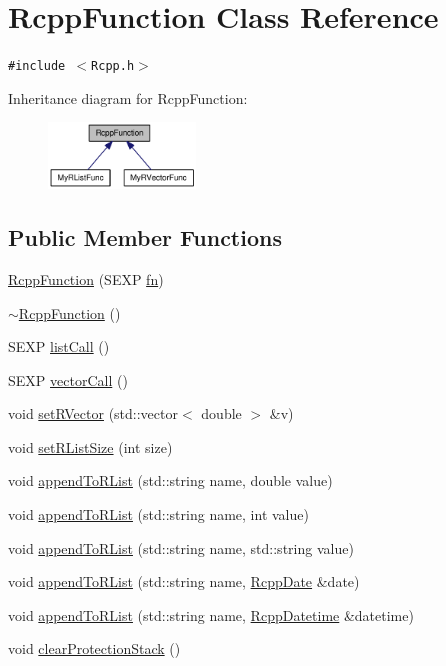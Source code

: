 \hypertarget{classRcppFunction}{
\section{RcppFunction Class Reference}
\label{classRcppFunction}
}
{\tt \#include $<$Rcpp.h$>$}

Inheritance diagram for RcppFunction:\nopagebreak
\begin{figure}[H]
\begin{center}
\leavevmode
\includegraphics[width=111pt]{classRcppFunction__inherit__graph}
\end{center}
\end{figure}
\subsection*{Public Member Functions}
\begin{CompactItemize}
\item 
\hyperlink{classRcppFunction_6fc6fca8d052170d86240c784f54261a}{RcppFunction} (SEXP \hyperlink{classRcppFunction_a6b5966224b8b7d158be6cdfc3612063}{fn})
\item 
\hyperlink{classRcppFunction_e155cf5dd33cb110e9a89a59c7bff6e9}{$\sim$RcppFunction} ()
\item 
SEXP \hyperlink{classRcppFunction_0cc9d29ab7db552494dddefaa78e6578}{listCall} ()
\item 
SEXP \hyperlink{classRcppFunction_c57c514c761609892ff553434e134446}{vectorCall} ()
\item 
void \hyperlink{classRcppFunction_482df5aa5e2a98d52c9a79cf3ab31c67}{setRVector} (std::vector$<$ double $>$ \&v)
\item 
void \hyperlink{classRcppFunction_f3dbcf8dcfbdfc49ef566b5efd0ad978}{setRListSize} (int size)
\item 
void \hyperlink{classRcppFunction_0df1a8ff093e21a2a7c6fc80d6645c7e}{appendToRList} (std::string name, double value)
\item 
void \hyperlink{classRcppFunction_fce449ac5d89b32e0e0b9f584278a672}{appendToRList} (std::string name, int value)
\item 
void \hyperlink{classRcppFunction_861ba7ae5c09acf31a034472b5a47728}{appendToRList} (std::string name, std::string value)
\item 
void \hyperlink{classRcppFunction_9aab0b3accb81d90fb813acf3bf4c49d}{appendToRList} (std::string name, \hyperlink{classRcppDate}{RcppDate} \&date)
\item 
void \hyperlink{classRcppFunction_0be4ab064287c2d3a5c3b883a1707d70}{appendToRList} (std::string name, \hyperlink{classRcppDatetime}{RcppDatetime} \&datetime)
\item 
void \hyperlink{classRcppFunction_689c914636f0f0e86b90da4425c6e6a3}{clearProtectionStack} ()
\end{CompactItemize}
